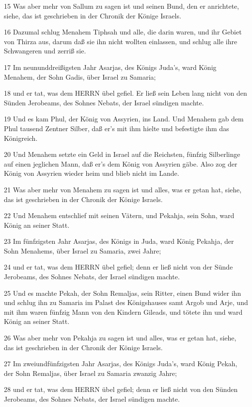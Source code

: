 \par 15 Was aber mehr von Sallum zu sagen ist und seinen Bund, den er anrichtete, siehe, das ist geschrieben in der Chronik der Könige Israels.
\par 16 Dazumal schlug Menahem Tiphsah und alle, die darin waren, und ihr Gebiet von Thirza aus, darum daß sie ihn nicht wollten einlassen, und schlug alle ihre Schwangeren und zerriß sie.
\par 17 Im neununddreißigsten Jahr Asarjas, des Königs Juda's, ward König Menahem, der Sohn Gadis, über Israel zu Samaria;
\par 18 und er tat, was dem HERRN übel gefiel. Er ließ sein Leben lang nicht von den Sünden Jerobeams, des Sohnes Nebats, der Israel sündigen machte.
\par 19 Und es kam Phul, der König von Assyrien, ins Land. Und Menahem gab dem Phul tausend Zentner Silber, daß er's mit ihm hielte und befestigte ihm das Königreich.
\par 20 Und Menahem setzte ein Geld in Israel auf die Reichsten, fünfzig Silberlinge auf einen jeglichen Mann, daß er's dem König von Assyrien gäbe. Also zog der König von Assyrien wieder heim und blieb nicht im Lande.
\par 21 Was aber mehr von Menahem zu sagen ist und alles, was er getan hat, siehe, das ist geschrieben in der Chronik der Könige Israels.
\par 22 Und Menahem entschlief mit seinen Vätern, und Pekahja, sein Sohn, ward König an seiner Statt.
\par 23 Im fünfzigsten Jahr Asarjas, des Königs in Juda, ward König Pekahja, der Sohn Menahems, über Israel zu Samaria, zwei Jahre;
\par 24 und er tat, was dem HERRN übel gefiel; denn er ließ nicht von der Sünde Jerobeams, des Sohnes Nebats, der Israel sündigen machte.
\par 25 Und es machte Pekah, der Sohn Remaljas, sein Ritter, einen Bund wider ihn und schlug ihn zu Samaria im Palast des Königshauses samt Argob und Arje, und mit ihm waren fünfzig Mann von den Kindern Gileads, und tötete ihn und ward König an seiner Statt.
\par 26 Was aber mehr von Pekahja zu sagen ist und alles, was er getan hat, siehe, das ist geschrieben in der Chronik der Könige Israels.
\par 27 Im zweiundfünfzigsten Jahr Asarjas, des Königs Juda's, ward König Pekah, der Sohn Remaljas, über Israel zu Samaria zwanzig Jahre;
\par 28 und er tat, was dem HERRN übel gefiel; denn er ließ nicht von den Sünden Jerobeams, des Sohnes Nebats, der Israel sündigen machte.

